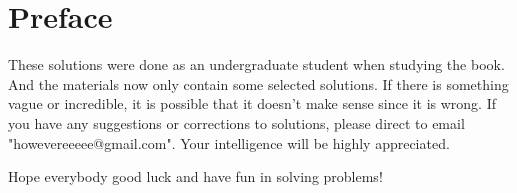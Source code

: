 \newpage
\chapter*{Preface}

These solutions were done as an undergraduate student when studying the book. And the materials now only contain some selected solutions. If there is something vague or incredible, it is possible that it doesn't make sense since it is wrong. If you have any suggestions or corrections to solutions, please direct to email "howevereeeee@gmail.com". Your intelligence will be highly appreciated.

Hope everybody good luck and have fun in solving problems!
